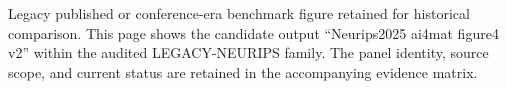 Legacy published or conference-era benchmark figure retained for historical comparison. This page shows the candidate output ``Neurips2025 ai4mat figure4 v2'' within the audited LEGACY-NEURIPS family. The panel identity, source scope, and current status are retained in the accompanying evidence matrix.
